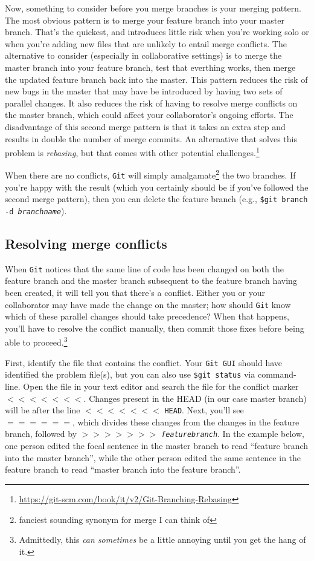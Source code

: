 \documentclass[12pt,letterpaper]{article}
\begin{document}
Now, something to consider before you merge branches is your merging pattern.
The most obvious pattern is to merge your feature branch into your master branch.
That's the quickest, and introduces little risk when you're working solo or when you're adding new files that are unlikely to entail merge conflicts.
The alternative to consider (especially in collaborative settings) is to merge the master branch into your feature branch, test that everthing works, then merge the updated feature branch back into the master.
This pattern reduces the risk of new bugs in the master that may have be introduced by having two sets of parallel changes.
It also reduces the risk of having to resolve merge conflicts on the master branch, which could affect your collaborator's ongoing efforts.
The disadvantage of this second merge pattern is that it takes an extra step and results in double the number of merge commits.
An alternative that solves this problem is \emph{rebasing}, but that comes with other potential challenges.\footnote{\url{https://git-scm.com/book/it/v2/Git-Branching-Rebasing}}

When there are no conflicts, \texttt{Git} will simply amalgamate\footnote{fanciest sounding synonym for merge I can think of} the two branches.
If you're happy with the result (which you certainly should be if you've followed the second merge pattern), then you can delete the feature branch (e.g., \texttt{\$git branch -d \emph{branchname}}).

\subsection{Resolving merge conflicts}

When \texttt{Git} notices that the same line of code has been changed on both the feature branch and the master branch subsequent to the feature branch having been created, it will tell you that there's a conflict.
Either you or your collaborator may have made the change on the master;
how should \texttt{Git} know which of these parallel changes should take precedence?
When that happens, you'll have to resolve the conflict manually, then commit those fixes before being able to proceed.\footnote{Admittedly, this \emph{can sometimes} be a little annoying until you get the hang of it.}

First, identify the file that contains the conflict.
Your \texttt{Git GUI} should have identified the problem file(s), but you can also use \texttt{\$git status} via command-line.
Open the file in your text editor and search the file for the conflict marker $<<<<<<<$.
Changes present in the HEAD (in our case master branch) will be after the line $<<<<<<<$ \texttt{HEAD}.
Next, you'll see $======$, which divides these changes from the changes in the feature branch, followed by $>>>>>>>$ \texttt{\emph{featurebranch}}.
In the example below, one person edited the focal sentence in the master branch to read ``feature branch into the master branch'', while the other person edited the same sentence in the feature branch to read ``master branch into the feature branch''.
\end{document}
